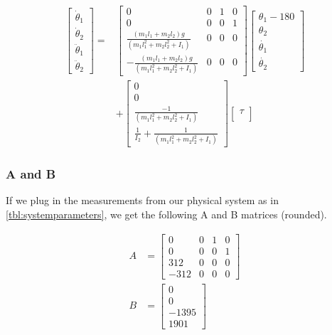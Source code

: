 \documentclass[conference]{IEEEtran}
\begin{document}
\begin{align}
    \begin{bmatrix}
        \dot\theta_1 \\
        \dot\theta_2 \\
        \ddot\theta_1 \\
        \ddot\theta_2
    \end{bmatrix}
    =&
    \begin{bmatrix}
        0 & 0 & 1 & 0 \\
        0 & 0 & 0 & 1 \\
        \frac{(m_1 l_1 + m_2 l_2) g}{(m_1 l_1^2 + m_2 l_2^2 + I_1)} & 0 & 0 & 0 \\
        - \frac{(m_1 l_1 + m_2 l_2) g}{(m_1 l_1^2 + m_2 l_2^2 + I_1)}  & 0 & 0 & 0
    \end{bmatrix}
    \begin{bmatrix}
        \theta_1 - 180 \\
        \theta_2 \\
        \dot{\theta_1} \\
        \dot{\theta_2}
    \end{bmatrix} \nonumber \\
    &+
    \begin{bmatrix}
        0 \\
        0 \\
        \frac{-1}{(m_1 l_1^2 + m_2 l_2^2 + I_1)} \\
        \frac{1}{I_2} + \frac{1}{(m_1 l_1^2 + m_2 l_2^2 + I_1)}
    \end{bmatrix}
    \begin{bmatrix}
        \tau \\
    \end{bmatrix}
\end{align}

\subsubsection{A and B}

If we plug in the measurements from our physical system as in
\cref{tbl:systemparameters}, we get the following A and B matrices (rounded).

\begin{align}
    A &= 
    \begin{bmatrix}
        0 & 0 & 1 & 0 \\
        0 & 0 & 0 & 1 \\
        312 & 0 & 0 & 0 \\
        -312  & 0 & 0 & 0
    \end{bmatrix} \\
    B &=  
    \begin{bmatrix}
        0 \\
        0 \\
        -1395\\
        1901
    \end{bmatrix}
\end{align}
\end{document}
